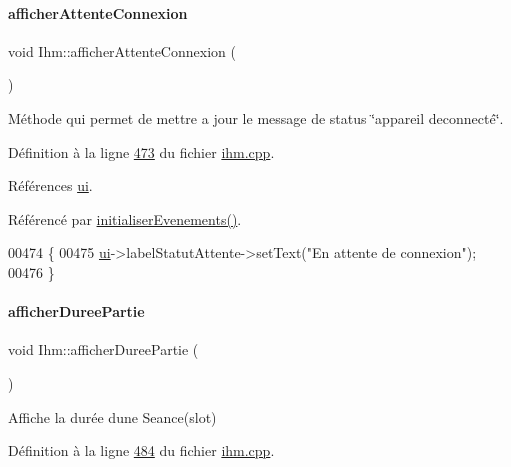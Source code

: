 \paragraph{\texorpdfstring{afficher\+Attente\+Connexion}{afficherAttenteConnexion}}
{\footnotesize\ttfamily void Ihm\+::afficher\+Attente\+Connexion (\begin{DoxyParamCaption}{ }\end{DoxyParamCaption})\hspace{0.3cm}{\ttfamily [slot]}}



Méthode qui permet de mettre a jour le message de status \char`\"{}appareil deconnecté\char`\"{}. 



Définition à la ligne \hyperlink{ihm_8cpp_source_l00473}{473} du fichier \hyperlink{ihm_8cpp_source}{ihm.\+cpp}.



Références \hyperlink{ihm_8h_source_l00052}{ui}.



Référencé par \hyperlink{ihm_8cpp_source_l00075}{initialiser\+Evenements()}.


\begin{DoxyCode}
00474 \{
00475     \hyperlink{class_ihm_a0ac5f47856566ceeeca1720109bf70ea}{ui}->labelStatutAttente->setText(\textcolor{stringliteral}{"En attente de connexion"});
00476 \}
\end{DoxyCode}
\mbox{\label{class_ihm_a808bd550b877499a38419a492595822e}} 
\paragraph{\texorpdfstring{afficher\+Duree\+Partie}{afficherDureePartie}}
{\footnotesize\ttfamily void Ihm\+::afficher\+Duree\+Partie (\begin{DoxyParamCaption}{ }\end{DoxyParamCaption})\hspace{0.3cm}{\ttfamily [slot]}}



Affiche la durée d\textquotesingle{}une Seance(slot) 



Définition à la ligne \hyperlink{ihm_8cpp_source_l00484}{484} du fichier \hyperlink{ihm_8cpp_source}{ihm.\+cpp}.



